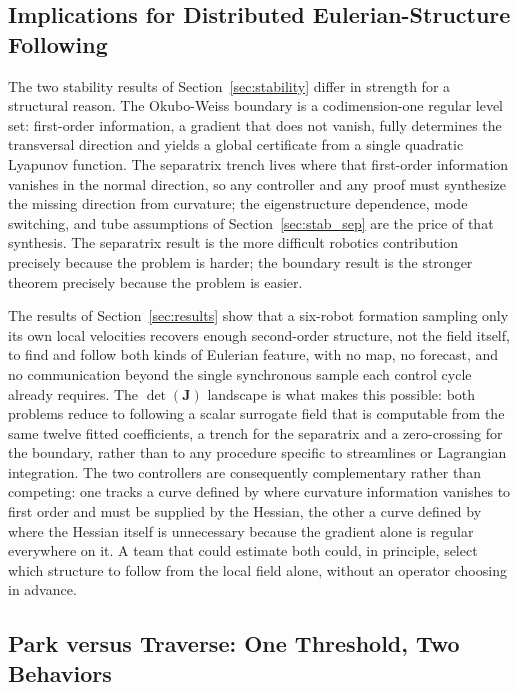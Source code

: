 \documentclass[12pt, letterpaper, oneside]{report}
\begin{document}
\subsection{Implications for Distributed Eulerian-Structure Following}

The two stability results of Section~\ref{sec:stability} differ in
strength for a structural reason. The Okubo-Weiss boundary is a
codimension-one regular level set: first-order information, a gradient
that does not vanish, fully determines the transversal direction and
yields a global certificate from a single quadratic Lyapunov function.
The separatrix trench lives where that first-order information vanishes
in the normal direction, so any controller and any proof must
synthesize the missing direction from curvature; the eigenstructure
dependence, mode switching, and tube assumptions of
Section~\ref{sec:stab_sep} are the price of that synthesis. The
separatrix result is the more difficult robotics contribution precisely
because the problem is harder; the boundary result is the stronger
theorem precisely because the problem is easier.

The results of Section~\ref{sec:results} show that a six-robot formation
sampling only its own local velocities recovers enough second-order
structure, not the field itself, to find and follow both kinds of
Eulerian feature, with no map, no forecast, and no communication beyond
the single synchronous sample each control cycle already requires. The
$\det(\mathbf{J})$ landscape is what makes this possible: both problems
reduce to following a scalar surrogate field that is computable from
the same twelve fitted coefficients, a trench for the separatrix and a
zero-crossing for the boundary, rather than to any procedure specific
to streamlines or Lagrangian integration. The two controllers are
consequently complementary rather than competing: one tracks a curve
defined by where curvature information vanishes to first order and must
be supplied by the Hessian, the other a curve defined by where the
Hessian itself is unnecessary because the gradient alone is regular
everywhere on it. A team that could estimate both could, in principle,
select which structure to follow from the local field alone, without an
operator choosing in advance.

\subsection{Park versus Traverse: One Threshold, Two Behaviors}
\label{sec:park_vs_traverse}
\end{document}
